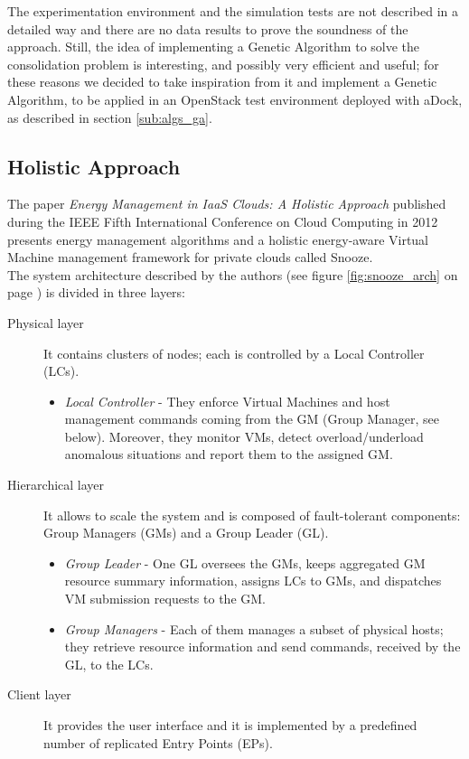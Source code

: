 The experimentation environment and the simulation tests are not described in a detailed way and there are no data results to prove the soundness of the approach. Still, the idea of implementing a Genetic Algorithm to solve the consolidation problem is interesting, and possibly very efficient and useful; for these reasons we decided to take inspiration from it and implement a Genetic Algorithm, to be applied in an OpenStack test environment deployed with aDock, as described in section \ref{sub:algs_ga}.

\subsection{Holistic Approach}
\label{sec:sota_holistic}
The paper \textit{Energy Management in IaaS Clouds: A Holistic Approach} published during the IEEE Fifth International Conference on Cloud Computing in 2012 presents energy management algorithms and a holistic energy-aware Virtual Machine management framework for private clouds called Snooze.\\
The system architecture described by the authors (see figure \ref{fig:snooze_arch} on page \pageref{fig:snooze_arch}) is divided in three layers:
\begin{description}
  \item[Physical layer] It contains clusters of nodes; each is controlled by a Local Controller (LCs).
    \begin{itemize}
      \item \textit{Local Controller} - They enforce Virtual Machines and host management commands coming from the GM (Group Manager, see below). Moreover, they monitor VMs, detect overload/underload anomalous situations and report them to the assigned GM.
    \end{itemize}
  \item[Hierarchical layer] It allows to scale the system and is composed of fault-tolerant components: Group Managers (GMs) and a Group Leader (GL).
      \begin{itemize}
      \item \textit{Group Leader} - One GL oversees the GMs, keeps aggregated GM resource summary information, assigns LCs to GMs, and dispatches VM submission requests to the GM.
      \item \textit{Group Managers} - Each of them manages a subset of physical hosts; they retrieve resource information and send commands, received by the GL, to the LCs.
      \end{itemize}
  \item[Client layer] It provides the user interface and it is implemented by a predefined number of replicated Entry Points (EPs).
\end{description}

